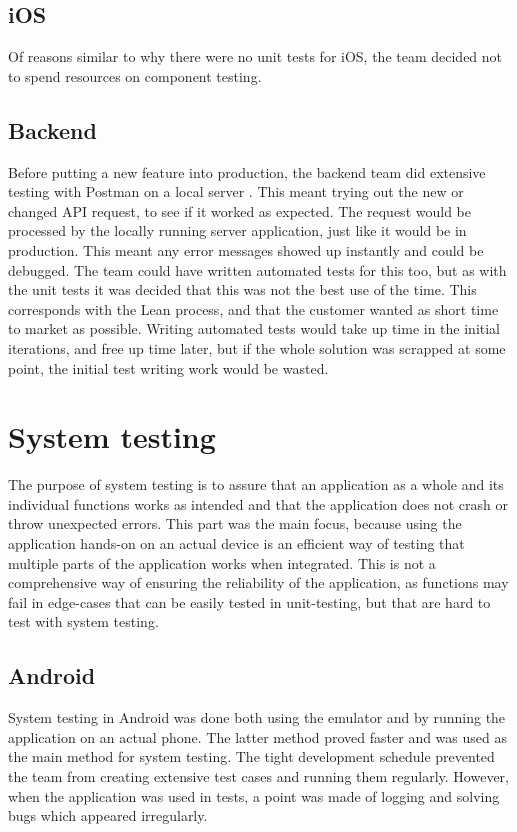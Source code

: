\subsection{iOS}
Of reasons similar to why there were no unit tests for iOS, the team decided not to spend resources on component testing.

\subsection{Backend}
Before putting a new feature into production, the \gls{backend} team did extensive testing with Postman on a local server \cite{postman}. This meant trying out the new or changed \gls{API} request, to see if it worked as expected. The request would be processed by the locally running server application, just like it would be in production. This meant any error messages showed up instantly and could be debugged. The team could have written automated tests for this too, but as with the unit tests it was decided that this was not the best use of the time. This corresponds with the Lean process, and that the customer wanted as short time to market as possible. Writing automated tests would take up time in the initial iterations, and free up time later, but if the whole solution was scrapped at some point, the initial test writing work would be wasted.

\section{System testing}
The purpose of system testing is to assure that an application as a whole and its individual functions works as intended and that the application does not crash or throw unexpected errors. \cite[p. 219-221]{progark} This part was the main focus, because using the application hands-on on an actual device is an efficient way of testing that multiple parts of the application works when integrated. This is not a comprehensive way of ensuring the reliability of the application, as functions may fail in edge-cases that can be easily tested in unit-testing, but that are hard to test with system testing. 

\subsection{Android}
System testing in Android was done both using the emulator and by running the application on an actual phone. The latter method proved faster and was used as the main method for system testing. The tight development schedule prevented the team from creating extensive test cases and running them regularly. However, when the application was used in tests, a point was made of logging and solving bugs which appeared irregularly.

